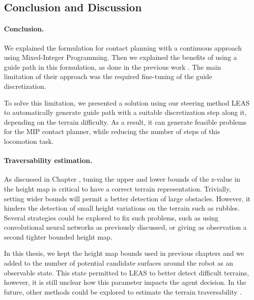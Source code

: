 \subsection{Conclusion and Discussion}
\label{subsub:mip:discussion}
\paragraph{Conclusion.}
We explained the formulation for contact planning with a continuous approach using Mixed-Integer Programming.
Then we explained the benefits of using a guide path in this formulation, as done in the previous work \cite{sl1m_v2}.
The main limitation of their approach was the required fine-tuning of the guide discretization.

To solve this limitation, we presented a solution using our steering method LEAS to automatically generate guide path with a suitable discretization step along it, depending on the terrain difficulty.
As a result, it can generate feasible problems for the MIP contact planner, while reducing the number of steps of this locomotion task.


\paragraph{Traversability estimation.}
As discussed in Chapter \cite{sec:LEAS}, tuning the upper and lower bounds of the z-value in the height map is critical to have a correct terrain representation.
Trivially, setting wider bounds will permit a better detection of large obstacles. However, it hinders the detection of small height variations on the terrain such as rubbles.
Several strategies could be explored to fix such problems, such as using convolutional neural networks as previously discussed, or giving as observation a second tighter bounded height map.

In this thesis, we kept the height map bounds used in previous chapters and we added to the number of potential candidate surfaces around the robot as an observable state.
This state permitted to LEAS to better detect difficult terrains, however, it is still unclear how this parameter impacts the agent decision. 
In the future, other methods could be explored to estimate the terrain traversability \cite{lin_traversability_2018, brandao_multimode_2019}.

